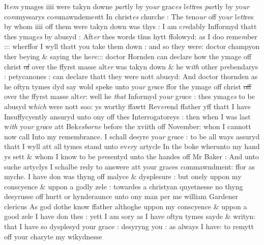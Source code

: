 \documentclass[12pt, a4paper]{book}
\begin{document}
It\textit{em} ymages iiii were takyn downe \textit{par}tly by yo\textit{ur} grac\textit{es} l\textit{ett}res \textit{par}tly by yo\textit{ur}  co\textit{m}myssarys co\textit{m}mawndeme\textit{n}tt In christ\textit{es} churche : The teno\textit{ur} off yo\textit{ur} l\textit{ett}res by whom iiii off them were takyn down was thys : I am c\textit{re}dably Infformyd thatt thes ymag\textit{es} by abusyd : Aft\textit{er} thes words thus hytt ffolowyd: as I doo reme\textit{m}ber ::: wherffor I wyll thatt you take them down : and so they were: doctor champyon ther  beying \& saying the he\textit{re}::: doctor Hornden can declare how the  ymage off christ \sout{of}
                over the ffyrst masse alt\textit{er} was takyn down \& he w\textit{ith} other p\textit{re}bendarys : petycanones : can declare thatt they were nott abusyd: And doctor thornden
			 as he oftyn tymes dyd say wold speke unto yo\textit{ur} g\textit{ra}ce ffor the ymage off christ \sout{off}
                  over the ffyrst masse alt\textit{er}: well
			 he \textit{that} Informyd yo\textit{ur} g\textit{ra}ce : thes ymag\textit{es} to be abusyd w\textit{hich} were nott soo: ys worthy ffawtt Rev\textit{er}end ffather yff thatt I have Insuffycyently ansuryd unto ony off thes Interrogatoreys : then when I was last w\textit{ith} yo\textit{ur} g\textit{ra}ce att Bek\textit{esborne} before the xviith off November: whon I cannott now call Into my remembrance. I schall desyre yo\textit{ur} g\textit{ra}ce : to be all ways assuryd thatt I wyll att all tymes stand unto ev\textit{er}y artycle In the boke wherunto my hand ys sett \& whom I know to be p\textit{re}sentyd unto the handes off Mr Baker : And unto suche artyclys I schalbe redy to answere att your graces commawndment: ffor as myche. I have don was thyng off malyce \& dysplesure : but onely uppon my conscyence \& uppon a godly zele : towardes a christyan quyetnesse no thyng desyrusse off hurtt or hynderaunce unto ony man per me william Gardener clericus As god dothe know ffather althoghe uppon my conscyence \& uppon a good zele I have don thes : yett I am sory as I have oftyn tymes sayde \& writyn: that I have so dysplesyd your grace : desyryng you : as always I have: to remytt off your charyte my wikydnesse 
                  
               
               
\dotfill
					
\end{document}
